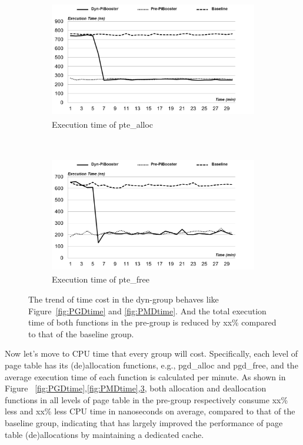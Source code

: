 \begin{figure}[t!]
    \centering
    \begin{subfigure}[t]{0.5\textwidth}
        \centering
        \includegraphics[height=2.0in]{image/micro/PTEalloc.png}
        \caption{Execution time of pte\_alloc}
        \label{fig:subfig:a}
    \end{subfigure}%
    ~
    \begin{subfigure}[t]{0.5\textwidth}
        \centering
        \includegraphics[height=2.0in]{image/micro/PTEfree.png}
        \caption{Execution time of pte\_free}
        \label{fig:subfig:b}
    \end{subfigure}
    \caption{The trend of time cost in the dyn-\name group behaves like Figure~\ref{fig:PGDtime} and \ref{fig:PMDtime}. And the total execution time of both functions in the pre-\name group is reduced by xx\% compared to that of the baseline group.}
    \label{fig:PTEtime}
\end{figure}

Now let’s move to CPU time that every group will cost. Specifically, each level of page table has its (de)allocation functions, e.g., pgd\_alloc and pgd\_free, and the average execution time of each function is calculated per minute. As shown in Figure~ \ref{fig:PGDtime},\ref{fig:PMDtime},\ref{fig:PTEtime}, both allocation and deallocation functions in all levels of page table in the pre-\name group respectively consume xx\% less and xx\% less CPU time in nanoseconds on average, compared to that of the baseline group, indicating that \name has largely improved the performance of page table (de)allocations by maintaining a dedicated cache.

